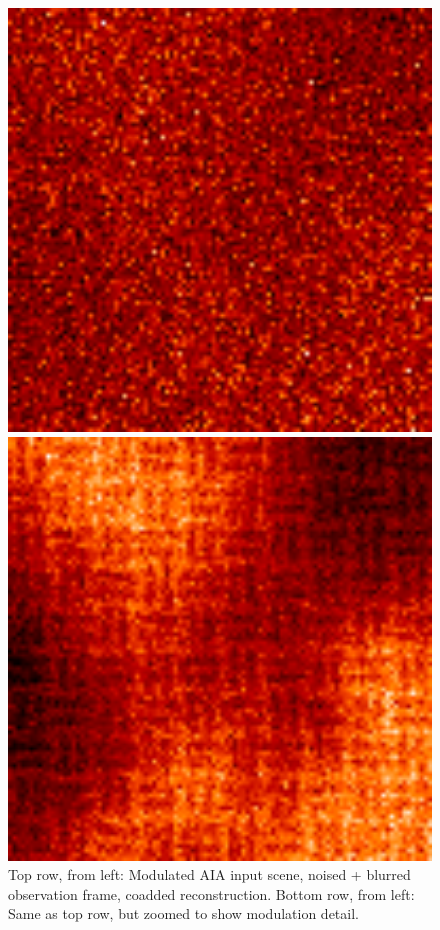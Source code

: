 \documentclass[tocnosub,noragright,centerchapter,12pt]{uiucecethesis09}
\begin{document}
\begin{figure}[h]
\begin{minipage}{.3\textwidth}
  \end{minipage}
  \begin{minipage}{.3\textwidth}
    \centering
    \includegraphics[width=1\textwidth]{figures/aia_frame_zoom.png}
  \end{minipage}
  \begin{minipage}{.3\textwidth}
    \centering
    \includegraphics[width=1\textwidth]{figures/aia_recon_zoom.png}
  \end{minipage}
  \caption{Top row, from left: Modulated AIA input scene, noised + blurred observation frame, coadded reconstruction.  Bottom row, from left: Same as top row, but zoomed to show modulation detail.}
  \label{fig:recon_aia}
\end{figure}
\end{document}
